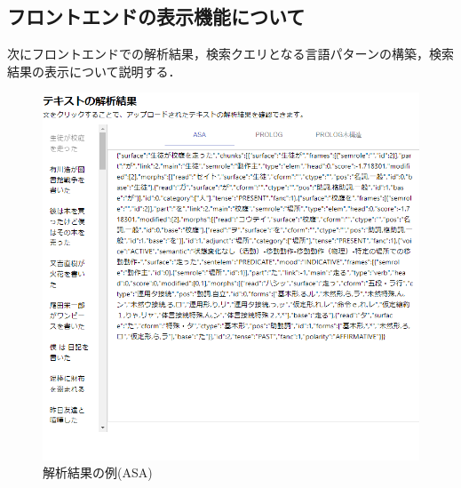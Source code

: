 \documentclass{FITpaper}
\begin{document}
\subsection{フロントエンドの表示機能について}
次にフロントエンドでの解析結果，検索クエリとなる言語パターンの構築，検索結果の表示について説明する．
\begin{figure}[htbp]
  \centering
  \includegraphics[scale=0.4]{fig/convert_result_asa.png}
  \caption{解析結果の例(ASA)}
  \label{fig:show_ASA}
\end{figure}
\end{document}
